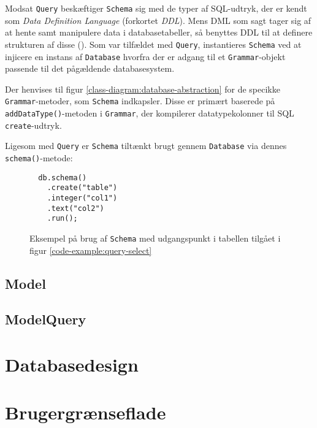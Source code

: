Modsat \texttt{Query} beskæftiger \texttt{Schema} sig med de typer af SQL-udtryk, der er kendt som \textit{Data Definition Language} (forkortet \textit{DDL}). Mens DML som sagt tager sig af at hente samt manipulere data i databasetabeller, så benyttes DDL til at definere strukturen af disse (\cite{wiki:ddl}). Som var tilfældet med \texttt{Query}, instantieres \texttt{Schema} ved at injicere en instans af \texttt{Database} hvorfra der er adgang til et \texttt{Grammar}-objekt passende til det pågældende databasesystem.

Der henvises til figur \ref{class-diagram:database-abstraction} for de specikke \texttt{Grammar}-metoder, som \texttt{Schema} indkapsler. Disse er primært baserede på \texttt{addDataType()}-metoden i \texttt{Grammar}, der kompilerer datatypekolonner til SQL \texttt{create}-udtryk.

Ligesom med \texttt{Query} er \texttt{Schema} tiltænkt brugt gennem \texttt{Database} via dennes \texttt{schema()}-metode:

\begin{figure}[h]
  \begin{verbatim}
  db.schema()
    .create("table")
    .integer("col1")
    .text("col2")
    .run();
  \end{verbatim}
  \caption{Eksempel på brug af \texttt{Schema} med udgangspunkt i tabellen tilgået i figur \ref{code-example:query-select}}
  \label{code-example:schema-create}
\end{figure}

\subsection{Model}

\subsection{ModelQuery}

\section{Databasedesign}

\section{Brugergrænseflade}